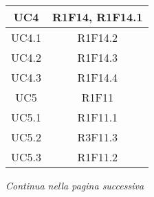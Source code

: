 \begin{table}[H]
\begin{tabular}{c | c}
		UC4                                                     & R1F14, R1F14.1 \\ \hline
		UC4.1                                                   & R1F14.2        \\ \hline
		UC4.2                                                   & R1F14.3        \\ \hline
		UC4.3                                                   & R1F14.4        \\ \hline
		UC5                                                     & R1F11          \\ \hline
		UC5.1                                                   & R1F11.1        \\ \hline
		UC5.2                                                   & R3F11.3        \\ \hline
		UC5.3                                                   & R1F11.2        \\ \hline
	\end{tabular}
\end{table}
\begin{center}
	\textit{\small Continua nella pagina successiva}
\end{center}
